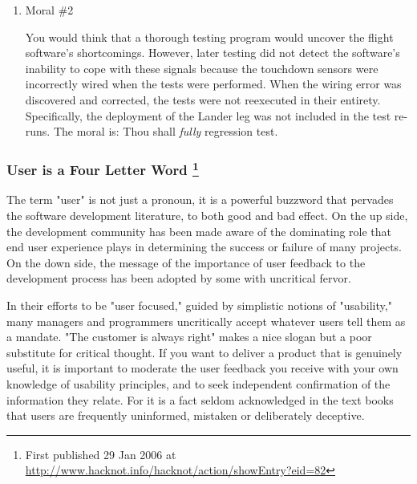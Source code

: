 \documentclass{article}
\begin{document}
\begin{enumerate}
\item Moral \#2
\label{sec:orgheadline226}

You would think that a thorough testing program would uncover the flight
software's shortcomings. However, later testing did not detect the
software's inability to cope with these signals because the touchdown
sensors were incorrectly wired when the tests were performed. When the
wiring error was discovered and corrected, the tests were not reexecuted
in their entirety. Specifically, the deployment of the Lander leg was
not included in the test re-runs. The moral is: Thou shall \emph{fully}
regression test.
\end{enumerate}

\subsubsection{User is a Four Letter Word \footnote{First published 29 Jan 2006 at
\url{http://www.hacknot.info/hacknot/action/showEntry?eid=82}}}
\label{sec:orgheadline230}

The term "user" is not just a pronoun, it is a powerful buzzword that
pervades the software development literature, to both good and bad
effect. On the up side, the development community has been made aware of
the dominating role that end user experience plays in determining the
success or failure of many projects. On the down side, the message of
the importance of user feedback to the development process has been
adopted by some with uncritical fervor.

In their efforts to be "user focused," guided by simplistic notions of
"usability," many managers and programmers uncritically accept whatever
users tell them as a mandate. "The customer is always right" makes a
nice slogan but a poor substitute for critical thought. If you want to
deliver a product that is genuinely useful, it is important to moderate
the user feedback you receive with your own knowledge of usability
principles, and to seek independent confirmation of the information they
relate. For it is a fact seldom acknowledged in the text books that
users are frequently uninformed, mistaken or deliberately deceptive.
\end{document}
